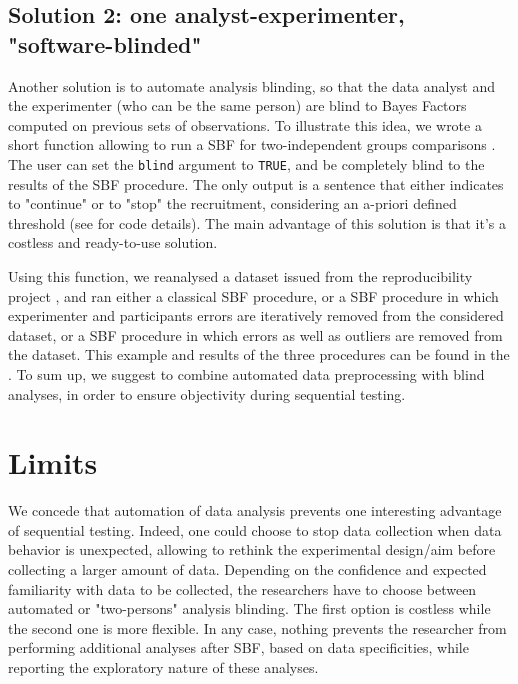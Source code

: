 \documentclass[a4paper,man,natbib,floatsintext,donotrepeattitle]{apa6}
\begin{document}
\subsection{Solution 2: one analyst-experimenter, "software-blinded"}

Another solution is to automate analysis blinding, so that the data analyst and the experimenter (who can be the same person) are blind to Bayes Factors computed on previous sets of observations. To illustrate this idea, we wrote a short function allowing to run a SBF for two-independent groups comparisons \citep[as in][]{schonbrodt_sequential_2017}. The user can set the \texttt{blind} argument to \texttt{TRUE}, and be completely blind to the results of the SBF procedure. The only output is a sentence that either indicates to "continue" or to "stop" the recruitment, considering an a-priori defined threshold (see  for code details). The main advantage of this solution is that it's a costless and ready-to-use solution.

Using this function, we reanalysed a dataset issued from the reproducibility project \citep{open_science_collaboration_estimating_2015}, and ran either a classical SBF procedure, or a SBF procedure in which experimenter and participants errors are iteratively removed from the considered dataset, or a SBF procedure in which errors as well as outliers are removed from the dataset. This example and results of the three procedures can be found in the . To sum up, we suggest to combine automated data preprocessing with blind analyses, in order to ensure objectivity during sequential testing.

\section{Limits}

We concede that automation of data analysis prevents one interesting advantage of sequential testing. Indeed, one could choose to stop data collection when data behavior is unexpected, allowing to rethink the experimental design/aim \citep{lakens_performing_2014} before collecting a larger amount of data. Depending on the confidence and expected familiarity with data to be collected, the researchers have to choose between automated or "two-persons" analysis blinding. The first option is costless while the second one is more flexible. In any case, nothing prevents the researcher from performing additional analyses after SBF, based on data specificities, while reporting the exploratory nature of these analyses.
\end{document}

